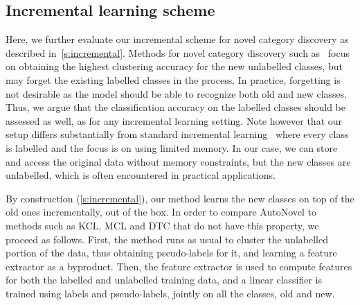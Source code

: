 \subsection{Incremental learning scheme}
Here, we further evaluate our incremental scheme for novel category discovery as described in~\cref{s:incremental}.
Methods for novel category discovery such as~\cite{han2019learning, Hsu19_MCL, Hsu18_L2C} focus on obtaining the highest clustering accuracy for the new unlabelled classes, but may forget the existing labelled classes in the process.
In practice, forgetting is not desirable as the model should be able to recognize both old and new classes.
Thus, we argue that the classification accuracy on the labelled classes should be assessed as well, as for any incremental learning setting.
Note however that our setup differs substantially from standard incremental learning~\cite{rebuffi2017icarl,lopez2017gradient,shmelkov2017incremental,aljundi2018memory} where every class is labelled and the focus is on using limited memory.
In our case, we can store and access the original data without memory constraints, but the new classes are unlabelled, which is often encountered in practical applications.

By construction (\cref{s:incremental}), our method learns the new classes on top of the old ones incrementally, out of the box.
In order to compare AutoNovel to methods such as KCL, MCL and DTC that do not have this property, we proceed as follows.
First, the method runs as usual to cluster the unlabelled portion of the data, thus obtaining pseudo-labels for it, and learning a feature extractor as a byproduct.
Then, the feature extractor is used to compute features for both the labelled and unlabelled training data, and a linear classifier is trained using labels and pseudo-labels, jointly on all the classes, old and new.



